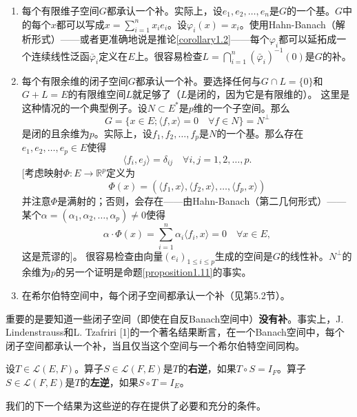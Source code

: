 \begin{example}
\begin{enumerate}
    \item 每个有限维子空间$G$都承认一个补。实际上，设$e_1, e_2, \dots, e_n$是$G$的一个基。$G$中的每个$x$都可以写成$x=\sum_{i=1}^n x_i e_i$。设$\varphi_i(x)=x_i$。使用Hahn-Banach（解析形式）——或者更准确地说是推论\ref{corollary1.2}——每个$\varphi_i$都可以延拓成一个连续线性泛函$\bar{\varphi}_i$定义在$E$上。很容易检查$L = \bigcap_{i=1}^n (\bar{\varphi}_i)^{-1}(0)$是$G$的补。
    \item 每个有限余维的闭子空间$G$都承认一个补。要选择任何与$G \cap L = \{0\}$和$G+L=E$的有限维空间$L$就足够了（$L$是闭的，因为它是有限维的）。
    这里是这种情况的一个典型例子。设$N \subset E^*$是$p$维的一个子空间。那么
    \[ G = \{x \in E; \langle f, x \rangle = 0 \quad \forall f \in N\} = N^\perp \]
    是闭的且余维为$p$。实际上，设$f_1, f_2, \dots, f_p$是$N$的一个基。那么存在$e_1, e_2, \dots, e_p \in E$使得
    \[ \langle f_i, e_j \rangle = \delta_{ij} \quad \forall i, j=1, 2, \dots, p. \]
    [考虑映射$\Phi: E \to \mathbb{R}^p$定义为
    \[ \Phi(x) = (\langle f_1, x \rangle, \langle f_2, x \rangle, \dots, \langle f_p, x \rangle) \]
    并注意$\Phi$是满射的；否则，会存在——由Hahn-Banach（第二几何形式）——某个$\alpha=(\alpha_1, \alpha_2, \dots, \alpha_p) \neq 0$使得
    \[ \alpha \cdot \Phi(x) = \sum_{i=1}^n \alpha_i \langle f_i, x \rangle = 0 \quad \forall x \in E, \]
    这是荒谬的]。
    很容易检查由向量$(e_i)_{1 \leq i \leq p}$生成的空间是$G$的线性补。$N^\perp$的余维为$p$的另一个证明是命题\ref{proposition1.11}的事实。
    \item 在希尔伯特空间中，每个闭子空间都承认一个补（见第5.2节）。
\end{enumerate}
\end{example}

\begin{remark}
重要的是要知道一些闭子空间（即使在自反Banach空间中）\textbf{没有补}。事实上，J. Lindenstrauss和L. Tzafriri [1]的一个著名结果断言，在一个Banach空间中，每个闭子空间都承认一个补，当且仅当这个空间与一个希尔伯特空间同构。
\end{remark}

\begin{definition}
设$T \in \mathcal{L}(E,F)$。算子$S \in \mathcal{L}(F,E)$是$T$的\textbf{右逆}，如果$T \circ S = I_F$。算子$S \in \mathcal{L}(F,E)$是$T$的\textbf{左逆}，如果$S \circ T = I_E$。
\end{definition}

我们的下一个结果为这些逆的存在提供了必要和充分的条件。

